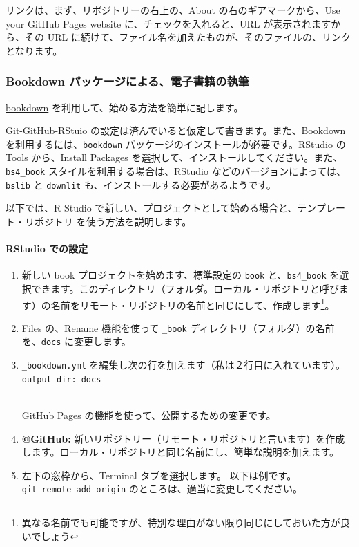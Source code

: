 \documentclass[
]{bxjsbook}
\providecommand{\tightlist}{%
  \setlength{\itemsep}{0pt}\setlength{\parskip}{0pt}}
\theoremstyle{definition}
\theoremstyle{definition}
\theoremstyle{definition}
\theoremstyle{definition}
\theoremstyle{remark}
\begin{document}
リンクは、まず、リポジトリーの右上の、About の右のギアマークから、Use your GitHub Pages website に、チェックを入れると、URL が表示されますから、その URL に続けて、ファイル名を加えたものが、そのファイルの、リンクとなります。

\hypertarget{bookdown-ux30d1ux30c3ux30b1ux30fcux30b8ux306bux3088ux308bux96fbux5b50ux66f8ux7c4dux306eux57f7ux7b46}{%
\subsubsection{Bookdown パッケージによる、電子書籍の執筆}\label{bookdown-ux30d1ux30c3ux30b1ux30fcux30b8ux306bux3088ux308bux96fbux5b50ux66f8ux7c4dux306eux57f7ux7b46}}

\href{https://github.com/rstudio/bookdown}{bookdown} を利用して、始める方法を簡単に記します。

Git-GitHub-RStuio の設定は済んでいると仮定して書きます。また、Bookdown を利用するには、\texttt{bookdown} パッケージのインストールが必要です。RStudio の Tools から、Install Packages を選択して、インストールしてください。また、\texttt{bs4\_book} スタイルを利用する場合は、RStudio などのバージョンによっては、\texttt{bslib} と \texttt{downlit} も、インストールする必要があるようです。

以下では、R Studio で新しい、プロジェクトとして始める場合と、テンプレート・リポジトリ を使う方法を説明します。

\hypertarget{rstudio-ux3067ux306eux8a2dux5b9a}{%
\paragraph{RStudio での設定}\label{rstudio-ux3067ux306eux8a2dux5b9a}}

\begin{enumerate}
\def\labelenumi{\arabic{enumi}.}
\tightlist
\item
  新しい book プロジェクトを始めます、標準設定の \texttt{book} と、\texttt{bs4\_book} を選択できます。このディレクトリ（フォルダ。ローカル・リポジトリと呼びます）の名前をリモート・リポジトリの名前と同じにして、作成します\footnote{異なる名前でも可能ですが、特別な理由がない限り同じにしておいた方が良いでしょう}。
\item
  Files の、Rename 機能を使って \texttt{\_book} ディレクトリ（フォルダ）の名前を、\texttt{docs} に変更します。
\item
  \texttt{\_bookdown.yml} を編集し次の行を加えます（私は２行目に入れています）。\\
  \texttt{output\_dir:\ docs}\strut \\
  GitHub Pages の機能を使って、公開するための変更です。
\item
  \textbf{@GitHub:} 新いリポジトリー（リモート・リポジトリと言います）を作成します。ローカル・リポジトリと同じ名前にし、簡単な説明を加えます。
\item
  左下の窓枠から、Terminal タブを選択します。 以下は例です。\texttt{git\ remote\ add\ origin} のところは、適当に変更してください。
\end{enumerate}
\end{document}
